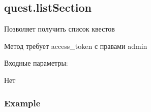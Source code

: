 \subsection{quest.listSection}

Позволяет получить список квестов

Метод требует access\_token с правами admin

Входные параметры:
\begin{itemize}
	Нет
\end{itemize}

\subsubsection{Example}
\begin{Verbatim}[frame=single]

\end{Verbatim}